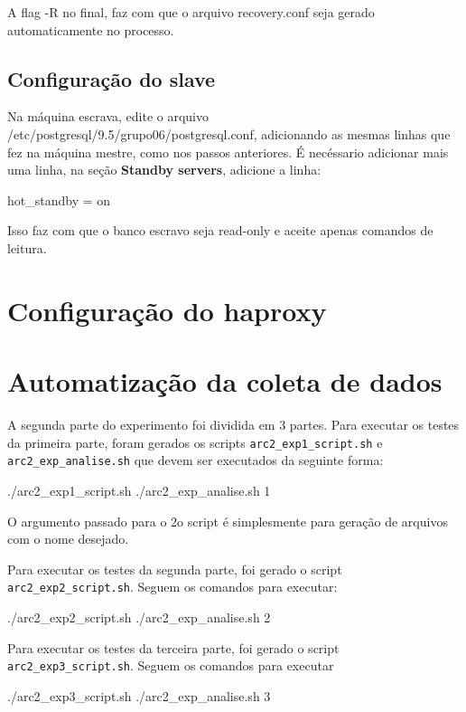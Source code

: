 \documentclass[a4paper,10pt]{article}
\begin{document}
          A flag -R no final, faz com que o arquivo recovery.conf seja gerado automaticamente no processo.

    \subsection{Configuração do slave}
        Na máquina escrava, edite o arquivo /etc/postgresql/9.5/grupo06/postgresql.conf, adicionando as mesmas linhas que fez na máquina mestre, como nos passos anteriores. É necéssario adicionar mais uma linha, na seção \textbf{Standby servers}, adicione a linha:
          \begin{spverbatim}
          	hot_standby = on
          \end{spverbatim}

        Isso faz com que o banco escravo seja read-only e aceite apenas comandos de leitura.

\section{Configuração do haproxy}
    
\section{Automatização da coleta de dados}
	
	A segunda parte do experimento foi dividida em 3 partes. Para executar os testes da primeira parte, foram gerados os scripts \verb|arc2_exp1_script.sh| e \verb|arc2_exp_analise.sh| que devem ser executados da seguinte forma:
	
 	\begin{spverbatim}
	      ./arc2_exp1_script.sh 
	      ./arc2_exp_analise.sh 1
	\end{spverbatim} 
\noindent
\newline
O argumento passado para o 2o script é simplesmente para geração de arquivos com o nome desejado.
\newline

Para executar os testes da segunda parte, foi gerado o script \verb|arc2_exp2_script.sh|. Seguem os comandos para executar:
	\begin{spverbatim}
	      ./arc2_exp2_script.sh 
	      ./arc2_exp_analise.sh 2
	\end{spverbatim}   
\noindent
\newline 	
Para executar os testes da terceira parte, foi gerado o script \verb|arc2_exp3_script.sh|. Seguem os comandos para executar
	\begin{spverbatim}
	      ./arc2_exp3_script.sh 
	      ./arc2_exp_analise.sh 3
	\end{spverbatim}   
\end{document}
